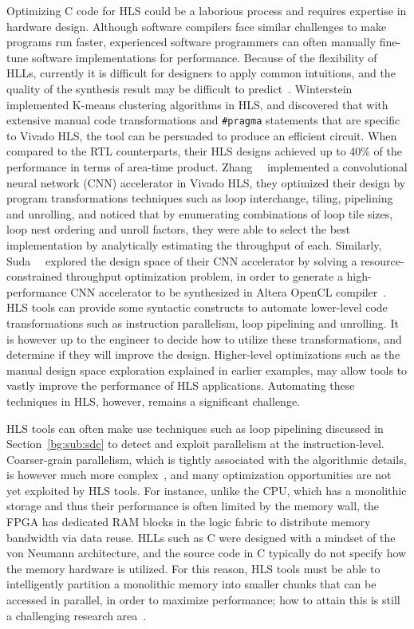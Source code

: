 Optimizing C code for HLS could be a laborious process and requires expertise
in hardware design.  Although software compilers face similar challenges
to make programs run faster, experienced software programmers can often
manually fine-tune software implementations for performance.  Because of
the flexibility of HLLs, currently it is difficult for designers to apply
common intuitions, and the quality of the synthesis result may be difficult
to predict~\cite{gupta04}.  Winterstein~\etal~\cite{felix13} implemented
K-means clustering algorithms in HLS, and discovered that with extensive
manual code transformations and \verb|#pragma| statements that are specific to
Vivado HLS, the tool can be persuaded to produce an efficient circuit.  When
compared to the RTL counterparts, their HLS designs achieved up to 40\% of
the performance in terms of area-time product.  Zhang~\etal~\cite{zhang15}
implemented a convolutional neural network (CNN) accelerator in Vivado HLS,
they optimized their design by program transformations techniques such as loop
interchange, tiling, pipelining and unrolling, and noticed that by enumerating
combinations of loop tile sizes, loop nest ordering and unroll factors, they
were able to select the best implementation by analytically estimating the
throughput of each.  Similarly, Suda~\etal~\cite{suda16} explored the design
space of their CNN accelerator by solving a resource-constrained throughput
optimization problem, in order to generate a high-performance CNN accelerator
to be synthesized in Altera OpenCL compiler~\cite{aoc}.  HLS tools can provide
some syntactic constructs to automate lower-level code transformations such
as instruction parallelism, loop pipelining and unrolling.  It is however up
to the engineer to decide how to utilize these transformations, and determine
if they will improve the design.  Higher-level optimizations such as the
manual design space exploration explained in earlier examples, may allow tools
to vastly improve the performance of HLS applications.  Automating these
techniques in HLS, however, remains a significant challenge.

HLS tools can often make use techniques such as loop pipelining discussed
in Section~\ref{bg:sub:sdc} to detect and exploit parallelism at the
instruction-level.  Coarser-grain parallelism, which is tightly associated with
the algorithmic details, is however much more complex~\cite{nane15}, and many
optimization opportunities are not yet exploited by HLS tools.  For instance,
unlike the CPU, which has a monolithic storage and thus their performance is
often limited by the memory wall, the FPGA has dedicated RAM blocks in the
logic fabric to distribute memory bandwidth via data reuse.  HLLs such as C
were designed with a mindset of the von Neumann architecture, and the source
code in C typically do not specify how the memory hardware is utilized.  For
this reason, HLS tools must be able to intelligently partition a monolithic
memory into smaller chunks that can be accessed in parallel, in order to
maximize performance; how to attain this is still a challenging research
area~\cite{cong11, cong12, wang13, felix15}.


